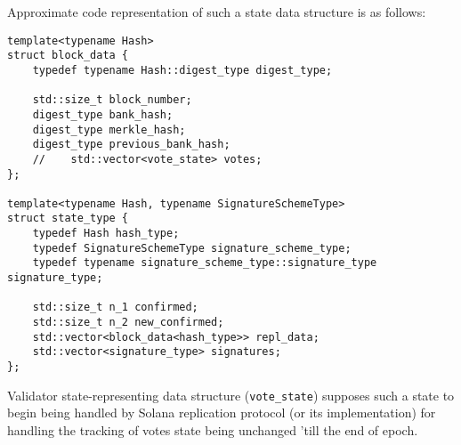 Approximate code representation of such a state data structure is as follows:
\begin{lstlisting}[frame=single]
template<typename Hash>
struct block_data {
    typedef typename Hash::digest_type digest_type;

    std::size_t block_number;
    digest_type bank_hash;
    digest_type merkle_hash;
    digest_type previous_bank_hash;
    //    std::vector<vote_state> votes;
};

template<typename Hash, typename SignatureSchemeType>
struct state_type {
    typedef Hash hash_type;
    typedef SignatureSchemeType signature_scheme_type;
    typedef typename signature_scheme_type::signature_type signature_type;

    std::size_t n_1 confirmed;
    std::size_t n_2 new_confirmed;
    std::vector<block_data<hash_type>> repl_data;
    std::vector<signature_type> signatures;
};
\end{lstlisting}

Validator state-representing data structure (\texttt{vote\_state}) supposes such
a state to begin being handled by Solana replication protocol (or its
implementation) for handling the tracking of votes state being unchanged 'till
the end of epoch.











